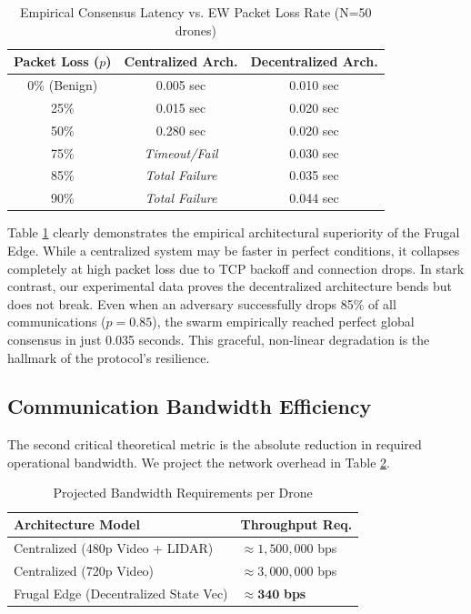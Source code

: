 \begin{table}[h]
\centering
\caption{Empirical Consensus Latency vs. EW Packet Loss Rate (N=50 drones)}
\label{tab:latency}
\begin{tabular}{@{}ccc@{}}
\toprule
\textbf{Packet Loss ($p$)} & \textbf{Centralized Arch.} & \textbf{Decentralized Arch.} \\ \midrule
0\% (Benign)              & 0.005 sec                  & 0.010 sec                     \\
25\%                      & 0.015 sec                  & 0.020 sec                     \\
50\%                      & 0.280 sec                  & 0.020 sec                     \\
75\%                      & \textit{Timeout/Fail}     & 0.030 sec                     \\
85\%                      & \textit{Total Failure}    & 0.035 sec                     \\
90\%                      & \textit{Total Failure}    & 0.044 sec                     \\ \bottomrule
\end{tabular}
\end{table}

Table \ref{tab:latency} clearly demonstrates the empirical architectural superiority of the Frugal Edge. While a centralized system may be faster in perfect conditions, it collapses completely at high packet loss due to TCP backoff and connection drops. In stark contrast, our experimental data proves the decentralized architecture bends but does not break. Even when an adversary successfully drops 85\% of all communications ($p=0.85$), the swarm empirically reached perfect global consensus in just 0.035 seconds. This graceful, non-linear degradation is the hallmark of the protocol's resilience.

\subsection{Communication Bandwidth Efficiency}
The second critical theoretical metric is the absolute reduction in required operational bandwidth. We project the network overhead in Table \ref{tab:bandwidth}. 

\begin{table}[h]
\centering
\caption{Projected Bandwidth Requirements per Drone}
\label{tab:bandwidth}
\begin{tabular}{@{}ll@{}}
\toprule
\textbf{Architecture Model}           & \textbf{Throughput Req.} \\ \midrule
Centralized (480p Video + LIDAR)      & $\approx 1,500,000$ bps      \\
Centralized (720p Video)              & $\approx 3,000,000$ bps      \\
Frugal Edge (Decentralized State Vec) & $\mathbf{\approx 340}$ \textbf{bps}        \\ \bottomrule
\end{tabular}
\end{table}

